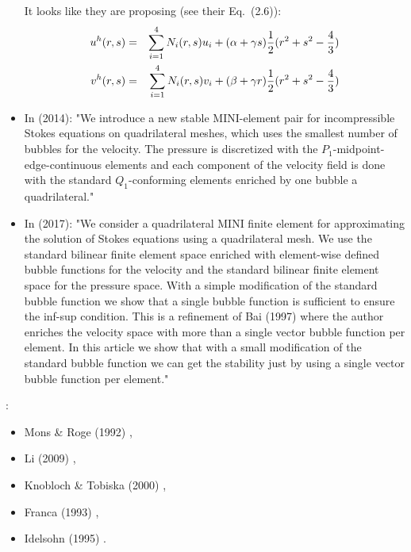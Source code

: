 \begin{itemize}
It looks like they are proposing (see their Eq.~(2.6)):
\begin{eqnarray}
u^h(r,s) &=& \sum_{i=1}^4 N_i (r,s) u_i + (\alpha + \gamma s)\frac{1}{2}(r^2+s^2-\frac43) \nonumber\\ 
v^h(r,s) &=& \sum_{i=1}^4 N_i (r,s) v_i + (\beta + \gamma r) \frac{1}{2}(r^2+s^2-\frac43)  
\end{eqnarray}

\item In \textcite{kwpa14} (2014): 
"We introduce a new stable MINI-element pair for incompressible Stokes equations on
quadrilateral meshes, which uses the smallest number of bubbles for the velocity. The pressure is 
discretized with the $P_1$-midpoint-edge-continuous elements and each component of the velocity field is
done with the standard $Q_1$-conforming elements enriched by one bubble a quadrilateral."

\item  In \textcite{lami17} (2017): "We consider a quadrilateral MINI
finite element for approximating the solution
of Stokes equations using a quadrilateral mesh. We use the standard bilinear finite
element space enriched with element-wise defined bubble functions for the velocity
and the standard bilinear finite element space for the pressure space. With a simple
modification of the standard bubble function we show that a single bubble function is
sufficient to ensure the inf-sup condition.
This is a refinement of Bai (1997) \cite{bai97} where the author enriches the velocity space with
more than a single vector bubble function per element. In this article we show that 
with a small modification of the standard bubble function we can get the stability just 
by using a single vector bubble function per element."



\end{itemize}


\Literature: 
\begin{itemize}
\item Mons \& Roge (1992) \cite{moro92}, 
\item Li \etal (2009) \cite{lihc09}, 
\item Knobloch \& Tobiska (2000) \cite{knto00}, 
\item Franca \etal (1993) \cite{frha93}, 
\item Idelsohn \etal (1995) \cite{idsn95}.
\end{itemize}


